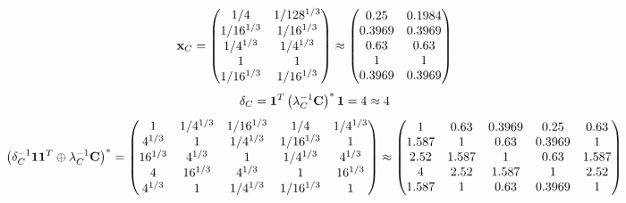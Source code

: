 \documentclass[10pt,a4paper]{article}
\begin{document}
	\[
		\bold{x}_{C} = 
		\begin{pmatrix}
			{1} / {{4}} & {1} / {{128^ {1 / 3}}} \\
			{1} / {{16^ {1 / 3}}} & {1} / {{16^ {1 / 3}}} \\
			{1} / {{4^ {1 / 3}}} & {1} / {{4^ {1 / 3}}} \\
			{1}{} & {1}{} \\
			{1} / {{16^ {1 / 3}}} & {1} / {{16^ {1 / 3}}} \\
		\end{pmatrix}
		\approx
		\begin{pmatrix}
			0.25     & 0.1984   \\
			0.3969   & 0.3969   \\
			0.63     & 0.63     \\
			1        & 1        \\
			0.3969   & 0.3969   \\
		\end{pmatrix}
	\]
	\[
		\delta_{C} = \bold{1}^T \left(\lambda_{C}^{-1}\bold{C}\right)^* \bold{1} = {{4}}{}\approx 4
	\]
	\[
		\left(\delta_{C}^{-1}\bold{11}^T \oplus \lambda_{C}^{-1}\bold{C}\right)^* = 
		\begin{pmatrix}
			{1}{} & {1} / {{4^ {1 / 3}}} & {1} / {{16^ {1 / 3}}} & {1} / {{4}} & {1} / {{4^ {1 / 3}}} \\
			{{4^ {1 / 3}}}{} & {1}{} & {1} / {{4^ {1 / 3}}} & {1} / {{16^ {1 / 3}}} & {1}{} \\
			{{16^ {1 / 3}}}{} & {{4^ {1 / 3}}}{} & {1}{} & {1} / {{4^ {1 / 3}}} & {{4^ {1 / 3}}}{} \\
			{{4}}{} & {{16^ {1 / 3}}}{} & {{4^ {1 / 3}}}{} & {1}{} & {{16^ {1 / 3}}}{} \\
			{{4^ {1 / 3}}}{} & {1}{} & {1} / {{4^ {1 / 3}}} & {1} / {{16^ {1 / 3}}} & {1}{} \\
		\end{pmatrix}
		\approx
		\begin{pmatrix}
			1        & 0.63     & 0.3969   & 0.25     & 0.63     \\
			1.587    & 1        & 0.63     & 0.3969   & 1        \\
			2.52     & 1.587    & 1        & 0.63     & 1.587    \\
			4        & 2.52     & 1.587    & 1        & 2.52     \\
			1.587    & 1        & 0.63     & 0.3969   & 1        \\
		\end{pmatrix}
	\]
\end{document}
